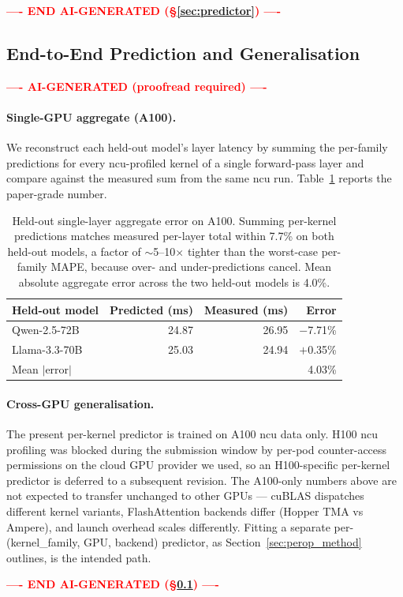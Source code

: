 \begin{center}\textcolor{red}{\small\textbf{---- END AI-GENERATED (\S\ref{sec:predictor}) ----}}\end{center}


\subsection{End-to-End Prediction and Generalisation}
\label{sec:e2e_prediction}

\begin{center}\textcolor{red}{\small\textbf{---- AI-GENERATED (proofread required) ----}}\end{center}

\paragraph{Single-GPU aggregate (A100).}
We reconstruct each held-out model's layer latency by summing the per-family predictions for every ncu-profiled kernel of a single forward-pass layer and compare against the measured sum from the same ncu run. Table~\ref{tab:e2e_layer_mape} reports the paper-grade number.

\begin{table}[!htbp]
\caption{Held-out single-layer aggregate error on A100. Summing per-kernel predictions matches measured per-layer total within 7.7\% on both held-out models, a factor of $\sim$5--10$\times$ tighter than the worst-case per-family MAPE, because over- and under-predictions cancel. Mean absolute aggregate error across the two held-out models is 4.0\%.}
\label{tab:e2e_layer_mape}
\centering
\small
\begin{tabular}{@{}lrrr@{}}
\toprule
\textbf{Held-out model} & \textbf{Predicted (ms)} & \textbf{Measured (ms)} & \textbf{Error} \\
\midrule
Qwen-2.5-72B  & 24.87 & 26.95 & $-$7.71\% \\
Llama-3.3-70B & 25.03 & 24.94 & $+$0.35\% \\
\midrule
Mean $|$error$|$ &  &  & 4.03\% \\
\bottomrule
\end{tabular}
\end{table}

\paragraph{Cross-GPU generalisation.}
The present per-kernel predictor is trained on A100 ncu data only. H100 ncu profiling was blocked during the submission window by per-pod counter-access permissions on the cloud GPU provider we used, so an H100-specific per-kernel predictor is deferred to a subsequent revision. The A100-only numbers above are not expected to transfer unchanged to other GPUs --- cuBLAS dispatches different kernel variants, FlashAttention backends differ (Hopper TMA vs Ampere), and launch overhead scales differently. Fitting a separate per-(kernel\_family, GPU, backend) predictor, as Section~\ref{sec:perop_method} outlines, is the intended path.

\begin{center}\textcolor{red}{\small\textbf{---- END AI-GENERATED (\S\ref{sec:e2e_prediction}) ----}}\end{center}

\FloatBarrier
